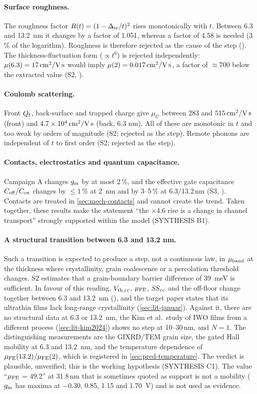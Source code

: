 \paragraph{Surface roughness.} The roughness factor $R(t) = (1-\Delta_{\mathrm{sr}}/t)^2$ rises monotonically with $t$. Between 6.3 and \SI{13.2}{nm} it changes by a factor of 1.051, whereas a factor of 4.58 is needed (3\,\% of the logarithm). Roughness is therefore rejected as the cause of the step (\evCAL). The thickness-fluctuation form ($\propto t^6$) is rejected independently: $\mu(6.3) = 17\,\mathrm{cm}^{2}/\mathrm{V\,s}$ would imply $\mu(2) = 0.017\,\mathrm{cm}^{2}/\mathrm{V\,s}$, a factor of $\approx 700$ below the extracted value (S2, \evSURR).

\paragraph{Coulomb scattering.} Front $Q_{\mathrm{f}}$, back-surface and trapped charge give $\mu_C$ between 283 and $515\,\mathrm{cm}^{2}/\mathrm{V\,s}$ (front) and $4.7\times10^4\,\mathrm{cm}^{2}/\mathrm{V\,s}$ (back, 6.3 nm). All of these are monotonic in $t$ and too weak by orders of magnitude (S2; rejected as the step). Remote phonons are independent of $t$ to first order (S2; rejected as the step).

\paragraph{Contacts, electrostatics and quantum capacitance.} Campaign A changes $g_{\mathrm{m}}$ by at most 2\,\%, and the effective gate capacitance $C_{\mathrm{eff}}/C_{\mathrm{ox}}$ changes by $\le 1$\,\% at \SI{2}{nm} and by 3--5\,\% at 6.3/13.2\,nm (S3, \evSURR). Contacts are treated in \cref{sec:mech-contacts} and cannot create the trend. Taken together, these results make the statement ``the $\times 4.6$ rise is a change in channel transport'' strongly supported within the model (SYNTHESIS B1).

\paragraph{A structural transition between 6.3 and 13.2 nm.} Such a transition is expected to produce a step, not a continuous law, in $\mu_{\mathrm{band}}$ at the thickness where crystallinity, grain coalescence or a percolation threshold changes. S2 estimates that a grain-boundary barrier difference of \SI{39}{meV} is sufficient. In favour of this reading, $V_{\mathrm{th,cc}}$, $\mu_{\mathrm{FE}}$, $\mathit{SS}_{\mathrm{cc}}$ and the off-floor change together between 6.3 and \SI{13.2}{nm} (\evCORR), and the target paper states that its ultrathin films lack long-range crystallinity (\cref{sec:lit-januar}). Against it, there are no structural data at 6.3 or \SI{13.2}{nm}, the Kim et al.\ study of IWO films from a different process (\cref{sec:lit-kim2024}) shows no step at 10--30\,nm, and $N = 1$. The distinguishing measurements are the GIXRD/TEM grain size, the gated Hall mobility at 6.3 and \SI{13.2}{nm}, and the temperature dependence of $\mu_{\mathrm{FE}}(13.2)/\mu_{\mathrm{FE}}(2)$, which is registered in \cref{sec:pred-temperature}. The verdict is plausible, unverified; this is the working hypothesis (SYNTHESIS C1). The value ``$\mu_{\mathrm{FE}}$ = 49.2'' at 31.8\,nm that is sometimes quoted as support is not a mobility ($g_{\mathrm{m}}$ has maxima at $-0.30$, 0.85, 1.15 and \SI{1.70}{V}) and is not used as evidence.

